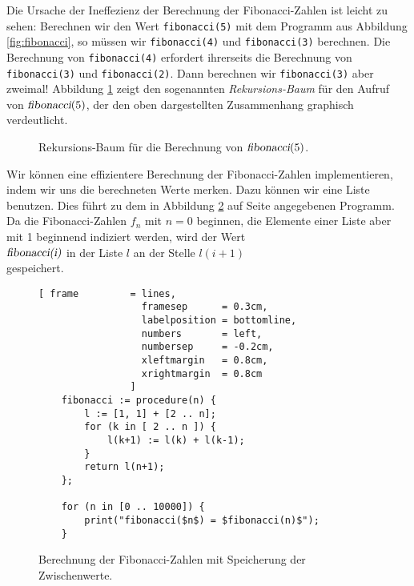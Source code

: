 Die Ursache der Ineffezienz der Berechnung der Fibonacci-Zahlen ist leicht zu sehen: Berechnen wir 
den Wert \texttt{fibonacci(5)} mit dem Programm aus Abbildung
\ref{fig:fibonacci}, so m\"{u}ssen wir \texttt{fibonacci(4)} und \texttt{fibonacci(3)} berechnen.
Die Berechnung von \texttt{fibonacci(4)} erfordert ihrerseits die Berechnung von \texttt{fibonacci(3)} und \texttt{fibonacci(2)}. 
Dann berechnen wir \texttt{fibonacci(3)} aber zweimal!  
Abbildung \ref{fig:fibonacci.eps} zeigt den sogenannten \emph{Rekursions-Baum} f\"{u}r den
Aufruf von $\textsl{fibonacci}(5)$, der den oben dargestellten Zusammenhang graphisch verdeutlicht.

\begin{figure}[!ht]
  \centering
  \caption{Rekursions-Baum f\"{u}r die Berechnung von $\textsl{fibonacci}(5)$.}
  \label{fig:fibonacci.eps}
\end{figure}


Wir k\"{o}nnen eine effizientere Berechnung der Fibonacci-Zahlen implementieren, indem wir
uns die berechneten Werte merken.  Dazu k\"{o}nnen wir eine Liste benutzen.
 Dies f\"{u}hrt zu dem in Abbildung \ref{fig:fibonacci-dynamic}
auf Seite \pageref{fig:fibonacci-dynamic} angegebenen Programm.  
 Da die Fibonacci-Zahlen $f_n$ mit $n=0$ beginnen, die Elemente einer Liste aber mit
1 beginnend indiziert werden, wird der Wert
\\[0.2cm]
\hspace*{1.3cm}
$\textsl{fibonacci(i)}$ \quad in der Liste $l$ an der Stelle \quad $l(i+1)$
\\[0.2cm]
gespeichert. 

\begin{figure}[!h]
  \centering
\begin{Verbatim}[ frame         = lines, 
                  framesep      = 0.3cm, 
                  labelposition = bottomline,
                  numbers       = left,
                  numbersep     = -0.2cm,
                  xleftmargin   = 0.8cm,
                  xrightmargin  = 0.8cm
                ]
    fibonacci := procedure(n) {
        l := [1, 1] + [2 .. n];
        for (k in [ 2 .. n ]) {
            l(k+1) := l(k) + l(k-1);
        }
        return l(n+1);
    };
    
    for (n in [0 .. 10000]) {
        print("fibonacci($n$) = $fibonacci(n)$");
    }
\end{Verbatim}
\vspace*{-0.3cm}
  \caption{Berechnung der Fibonacci-Zahlen mit Speicherung der Zwischenwerte.}
  \label{fig:fibonacci-dynamic}
\end{figure} 



